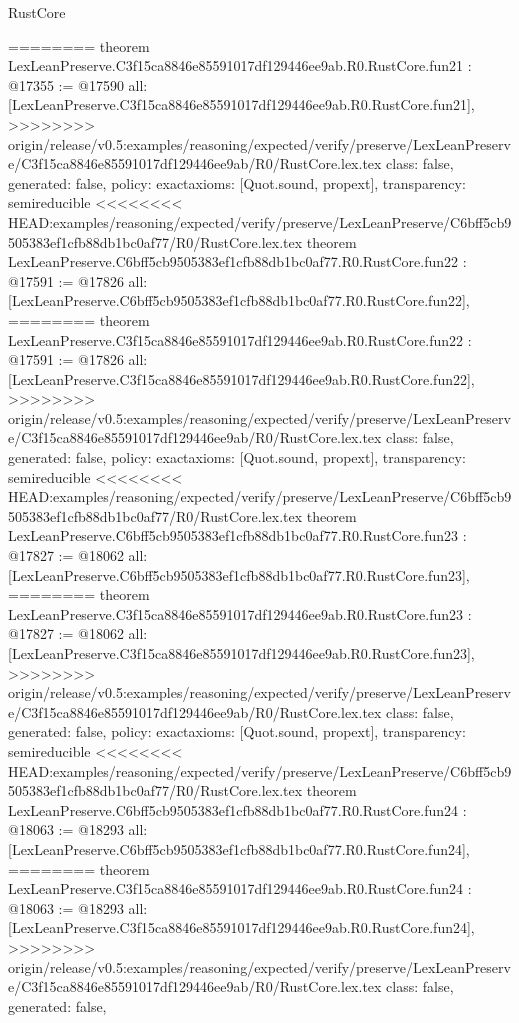 \begin{lexlean}{RustCore}
\begin{coremodule}
{\begin{coremodule}
{{{{{{{{{{{{{{{{{{{{{{{{========
theorem LexLeanPreserve.C3f15ca8846e85591017df129446ee9ab.R0.RustCore.fun21 : @17355 := @17590 {
  all: [LexLeanPreserve.C3f15ca8846e85591017df129446ee9ab.R0.RustCore.fun21],
>>>>>>>> origin/release/v0.5:examples/reasoning/expected/verify/preserve/LexLeanPreserve/C3f15ca8846e85591017df129446ee9ab/R0/RustCore.lex.tex
  class: false,
  generated: false,
  policy: exact{axioms: [Quot.sound, propext]},
  transparency: semireducible
}
<<<<<<<< HEAD:examples/reasoning/expected/verify/preserve/LexLeanPreserve/C6bff5cb9505383ef1cfb88db1bc0af77/R0/RustCore.lex.tex
theorem LexLeanPreserve.C6bff5cb9505383ef1cfb88db1bc0af77.R0.RustCore.fun22 : @17591 := @17826 {
  all: [LexLeanPreserve.C6bff5cb9505383ef1cfb88db1bc0af77.R0.RustCore.fun22],
========
theorem LexLeanPreserve.C3f15ca8846e85591017df129446ee9ab.R0.RustCore.fun22 : @17591 := @17826 {
  all: [LexLeanPreserve.C3f15ca8846e85591017df129446ee9ab.R0.RustCore.fun22],
>>>>>>>> origin/release/v0.5:examples/reasoning/expected/verify/preserve/LexLeanPreserve/C3f15ca8846e85591017df129446ee9ab/R0/RustCore.lex.tex
  class: false,
  generated: false,
  policy: exact{axioms: [Quot.sound, propext]},
  transparency: semireducible
}
<<<<<<<< HEAD:examples/reasoning/expected/verify/preserve/LexLeanPreserve/C6bff5cb9505383ef1cfb88db1bc0af77/R0/RustCore.lex.tex
theorem LexLeanPreserve.C6bff5cb9505383ef1cfb88db1bc0af77.R0.RustCore.fun23 : @17827 := @18062 {
  all: [LexLeanPreserve.C6bff5cb9505383ef1cfb88db1bc0af77.R0.RustCore.fun23],
========
theorem LexLeanPreserve.C3f15ca8846e85591017df129446ee9ab.R0.RustCore.fun23 : @17827 := @18062 {
  all: [LexLeanPreserve.C3f15ca8846e85591017df129446ee9ab.R0.RustCore.fun23],
>>>>>>>> origin/release/v0.5:examples/reasoning/expected/verify/preserve/LexLeanPreserve/C3f15ca8846e85591017df129446ee9ab/R0/RustCore.lex.tex
  class: false,
  generated: false,
  policy: exact{axioms: [Quot.sound, propext]},
  transparency: semireducible
}
<<<<<<<< HEAD:examples/reasoning/expected/verify/preserve/LexLeanPreserve/C6bff5cb9505383ef1cfb88db1bc0af77/R0/RustCore.lex.tex
theorem LexLeanPreserve.C6bff5cb9505383ef1cfb88db1bc0af77.R0.RustCore.fun24 : @18063 := @18293 {
  all: [LexLeanPreserve.C6bff5cb9505383ef1cfb88db1bc0af77.R0.RustCore.fun24],
========
theorem LexLeanPreserve.C3f15ca8846e85591017df129446ee9ab.R0.RustCore.fun24 : @18063 := @18293 {
  all: [LexLeanPreserve.C3f15ca8846e85591017df129446ee9ab.R0.RustCore.fun24],
>>>>>>>> origin/release/v0.5:examples/reasoning/expected/verify/preserve/LexLeanPreserve/C3f15ca8846e85591017df129446ee9ab/R0/RustCore.lex.tex
  class: false,
  generated: false,
}}}}}}}}}}}}}}}}}}}}}}}}}}}}
\end{coremodule}}
\end{coremodule}
\end{lexlean}
